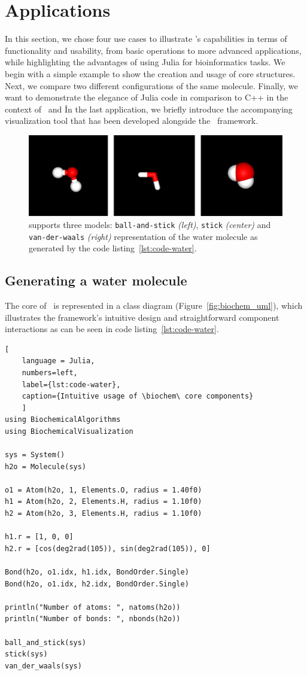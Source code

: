 \section{Applications}
\label{sec:applications}

In this section, we chose four use cases to illustrate \biochem's capabilities in terms of functionality and usability, from basic operations to more advanced applications, while highlighting the advantages of using Julia for bioinformatics tasks.
We begin with a simple example to show the creation and usage of core structures. Next, we compare two different configurations of the same molecule. Finally, we want to demonstrate the elegance of Julia code in comparison to C++ in the context of \ball\ and \biochem\. In the last application, we briefly introduce the accompanying visualization tool \bioviz that has been developed alongside the \biochem\ framework.
 \begin{figure}[t]
	\includegraphics[width=18cm]{gfx/biovis-2.png}
	\caption{\bioviz supports three models:  \texttt{ball-and-stick} \textit{(left)}, \texttt{stick} \textit{(center)} and \texttt{van-der-waals} \textit{(right)} representation of the water molecule as generated by the code listing~\ref{lst:code-water}.}
	\label{fig:biochem_water}
\end{figure}

\subsection{Generating a water molecule}


The core of \biochem\ is represented in a class diagram (Figure~\ref{fig:biochem_uml}), which illustrates the framework's intuitive design and straightforward component interactions as can be seen in code listing~\ref{lst:code-water}. 
\begin{lstlisting}[
	language = Julia, 
	numbers=left, 
	label={lst:code-water}, 
	caption={Intuitive usage of \biochem\ core components}
	]
using BiochemicalAlgorithms
using BiochemicalVisualization
	
sys = System() 
h2o = Molecule(sys)
	
o1 = Atom(h2o, 1, Elements.O, radius = 1.40f0)
h1 = Atom(h2o, 2, Elements.H, radius = 1.10f0)
h2 = Atom(h2o, 3, Elements.H, radius = 1.10f0)
	
h1.r = [1, 0, 0]
h2.r = [cos(deg2rad(105)), sin(deg2rad(105)), 0]

Bond(h2o, o1.idx, h1.idx, BondOrder.Single)
Bond(h2o, o1.idx, h2.idx, BondOrder.Single)
	
println("Number of atoms: ", natoms(h2o))
println("Number of bonds: ", nbonds(h2o))
	
ball_and_stick(sys)	
stick(sys)
van_der_waals(sys)
\end{lstlisting}

